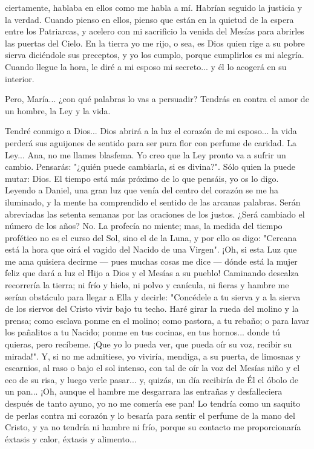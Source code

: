 \documentclass[12pt]{book} %
\begin{document}
ciertamente, hablaba en ellos como me habla a mí. Habrían seguido la justicia y la verdad. Cuando pienso en ellos, pienso que están en la quietud de la espera entre los Patriarcas, y acelero con mi sacrificio la venida del Mesías para abrirles las puertas del Cielo. En la tierra yo me rijo, o sea, es Dios quien rige a su pobre sierva diciéndole sus preceptos, y yo los cumplo, porque cumplirlos es mi alegría. Cuando llegue la hora, le diré a mi esposo mi secreto... y él lo acogerá en su interior. 

Pero, María... ¿con qué palabras lo vas a persuadir? Tendrás en contra el amor de un hombre, la Ley y la vida. 

Tendré conmigo a Dios... Dios abrirá a la luz el corazón de mi esposo... la vida perderá sus aguijones de sentido para ser pura flor con perfume de caridad. La Ley... Ana, no me llames blasfema. Yo creo que la Ley pronto va a sufrir un cambio. Pensarás: "¿quién puede cambiarla, si es divina?". Sólo quien la puede mutar: Dios. El tiempo está más próximo de lo que pensáis, yo os lo digo. Leyendo a Daniel, una gran luz que venía del centro del corazón se me ha iluminado, y la mente ha comprendido el sentido de las arcanas palabras. Serán abreviadas las setenta semanas por las oraciones de los justos. ¿Será cambiado el número de los años? No. La profecía no miente; mas, la medida del tiempo profético no es el curso del Sol, sino el de la Luna, y por ello os digo: "Cercana está la hora que oirá el vagido del Nacido de una Virgen". ¡Oh, si esta Luz que me ama quisiera decirme — pues muchas cosas me dice — dónde está la mujer feliz que dará a luz el Hijo a Dios y el Mesías a su pueblo! Caminando descalza recorrería la tierra; ni frío y hielo, ni polvo y canícula, ni fieras y hambre me serían obstáculo para llegar a Ella y decirle: "Concédele a tu sierva y a la sierva de los siervos del Cristo vivir bajo tu techo. Haré girar la rueda del molino y la prensa; como esclava ponme en el molino; como pastora, a tu rebaño; o para lavar los pañalitos a tu Nacido; ponme en tus cocinas, en tus hornos... donde tú quieras, pero recíbeme. ¡Que yo lo pueda ver, que pueda oír su voz, recibir su mirada!". Y, si no me admitiese, yo viviría, mendiga, a su puerta, de limosnas y escarnios, al raso o bajo el sol intenso, con tal de oír la voz del Mesías niño y el eco de su risa, y luego verle pasar... y, quizás, un día recibiría de Él el óbolo de un pan... ¡Oh, aunque el hambre me desgarrara las entrañas y desfalleciera después de tanto ayuno, yo no me comería ese pan! Lo tendría como un saquito de perlas contra mi corazón y lo besaría para sentir el perfume de la mano del Cristo, y ya no tendría ni hambre ni frío, porque su contacto me proporcionaría éxtasis y calor, éxtasis y alimento... 
\end{document}
